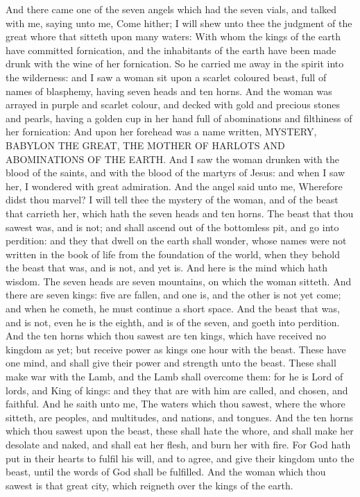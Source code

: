  And there came one of the seven angels which had the seven
vials, and talked with me, saying unto me, Come hither; I will shew unto
thee the judgment of the great whore that sitteth upon many waters:
 With whom the kings of the earth have committed
fornication, and the inhabitants of the earth have been made drunk with
the wine of her fornication.  So he carried me away in the
spirit into the wilderness: and I saw a woman sit upon a scarlet
coloured beast, full of names of blasphemy, having seven heads and ten
horns.  And the woman was arrayed in purple and scarlet
colour, and decked with gold and precious stones and pearls, having a
golden cup in her hand full of abominations and filthiness of her
fornication:  And upon her forehead was a name written,
MYSTERY, BABYLON THE GREAT, THE MOTHER OF HARLOTS AND ABOMINATIONS OF
THE EARTH.  And I saw the woman drunken with the blood of
the saints, and with the blood of the martyrs of Jesus: and when I saw
her, I wondered with great admiration.  And the angel said
unto me, Wherefore didst thou marvel? I will tell thee the mystery of
the woman, and of the beast that carrieth her, which hath the seven
heads and ten horns.  The beast that thou sawest was, and is
not; and shall ascend out of the bottomless pit, and go into perdition:
and they that dwell on the earth shall wonder, whose names were not
written in the book of life from the foundation of the world, when they
behold the beast that was, and is not, and yet is.  And here
is the mind which hath wisdom. The seven heads are seven mountains, on
which the woman sitteth.  And there are seven kings: five
are fallen, and one is, and the other is not yet come; and when he
cometh, he must continue a short space.  And the beast that
was, and is not, even he is the eighth, and is of the seven, and goeth
into perdition.  And the ten horns which thou sawest are
ten kings, which have received no kingdom as yet; but receive power as
kings one hour with the beast.  These have one mind, and
shall give their power and strength unto the beast.  These
shall make war with the Lamb, and the Lamb shall overcome them: for he
is Lord of lords, and King of kings: and they that are with him are
called, and chosen, and faithful.  And he saith unto me,
The waters which thou sawest, where the whore sitteth, are peoples, and
multitudes, and nations, and tongues.  And the ten horns
which thou sawest upon the beast, these shall hate the whore, and shall
make her desolate and naked, and shall eat her flesh, and burn her with
fire.  For God hath put in their hearts to fulfil his will,
and to agree, and give their kingdom unto the beast, until the words of
God shall be fulfilled.  And the woman which thou sawest is
that great city, which reigneth over the kings of the earth.

